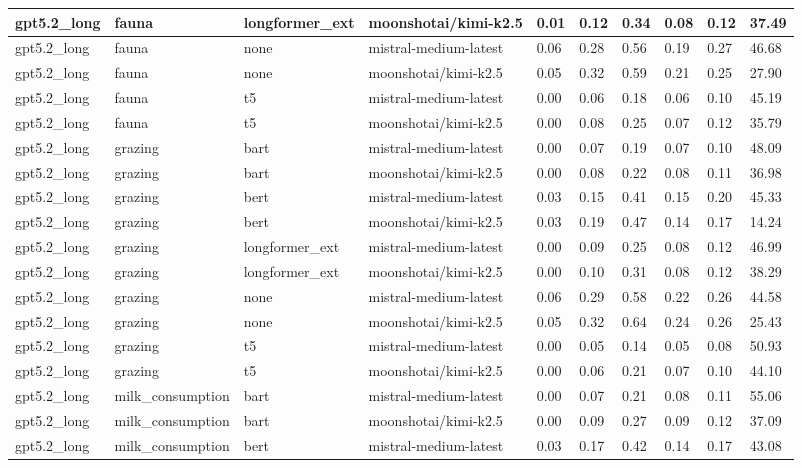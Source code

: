 \begin{tabular}{|l|l|l|l|l|l|l|l|l|l|}
 \hline
 gpt5.2\_long & fauna & longformer\_ext & moonshotai/kimi-k2.5 & 0.01 & 0.12 & 0.34 & 0.08 & 0.12 & 37.49 \\
 \hline
 gpt5.2\_long & fauna & none & mistral-medium-latest & 0.06 & 0.28 & 0.56 & 0.19 & 0.27 & 46.68 \\
 \hline
 gpt5.2\_long & fauna & none & moonshotai/kimi-k2.5 & 0.05 & 0.32 & 0.59 & 0.21 & 0.25 & 27.90 \\
 \hline
 gpt5.2\_long & fauna & t5 & mistral-medium-latest & 0.00 & 0.06 & 0.18 & 0.06 & 0.10 & 45.19 \\
 \hline
 gpt5.2\_long & fauna & t5 & moonshotai/kimi-k2.5 & 0.00 & 0.08 & 0.25 & 0.07 & 0.12 & 35.79 \\
 \hline
 gpt5.2\_long & grazing & bart & mistral-medium-latest & 0.00 & 0.07 & 0.19 & 0.07 & 0.10 & 48.09 \\
 \hline
 gpt5.2\_long & grazing & bart & moonshotai/kimi-k2.5 & 0.00 & 0.08 & 0.22 & 0.08 & 0.11 & 36.98 \\
 \hline
 gpt5.2\_long & grazing & bert & mistral-medium-latest & 0.03 & 0.15 & 0.41 & 0.15 & 0.20 & 45.33 \\
 \hline
 gpt5.2\_long & grazing & bert & moonshotai/kimi-k2.5 & 0.03 & 0.19 & 0.47 & 0.14 & 0.17 & 14.24 \\
 \hline
 gpt5.2\_long & grazing & longformer\_ext & mistral-medium-latest & 0.00 & 0.09 & 0.25 & 0.08 & 0.12 & 46.99 \\
 \hline
 gpt5.2\_long & grazing & longformer\_ext & moonshotai/kimi-k2.5 & 0.00 & 0.10 & 0.31 & 0.08 & 0.12 & 38.29 \\
 \hline
 gpt5.2\_long & grazing & none & mistral-medium-latest & 0.06 & 0.29 & 0.58 & 0.22 & 0.26 & 44.58 \\
 \hline
 gpt5.2\_long & grazing & none & moonshotai/kimi-k2.5 & 0.05 & 0.32 & 0.64 & 0.24 & 0.26 & 25.43 \\
 \hline
 gpt5.2\_long & grazing & t5 & mistral-medium-latest & 0.00 & 0.05 & 0.14 & 0.05 & 0.08 & 50.93 \\
 \hline
 gpt5.2\_long & grazing & t5 & moonshotai/kimi-k2.5 & 0.00 & 0.06 & 0.21 & 0.07 & 0.10 & 44.10 \\
 \hline
 gpt5.2\_long & milk\_consumption & bart & mistral-medium-latest & 0.00 & 0.07 & 0.21 & 0.08 & 0.11 & 55.06 \\
 \hline
 gpt5.2\_long & milk\_consumption & bart & moonshotai/kimi-k2.5 & 0.00 & 0.09 & 0.27 & 0.09 & 0.12 & 37.09 \\
 \hline
 gpt5.2\_long & milk\_consumption & bert & mistral-medium-latest & 0.03 & 0.17 & 0.42 & 0.14 & 0.17 & 43.08 \\

\end{tabular}
